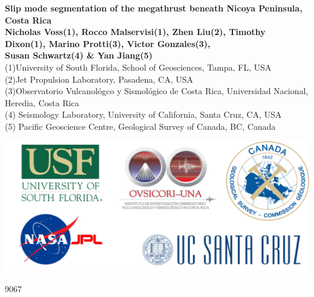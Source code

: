 \documentclass[a0,landscape]{a0poster}
\begin{document}


\begin{minipage}[c]{0.75\linewidth}
\fontsize{4cm}{4.5cm} \color{NavyBlue} 
\vspace{1cm}
\textbf{Slip mode segmentation of the megathrust beneath Nicoya Peninsula, Costa Rica} \color{Black}\\ %

\huge \textbf{Nicholas Voss(1), Rocco Malservisi(1), Zhen Liu(2), Timothy Dixon(1), Marino Protti(3), Victor Gonzales(3),\\ Susan Schwartz(4) \& Yan Jiang(5)}\\ %
\large 
(1)University of South Florida, School of Geosciences, Tampa, FL, USA\\  
(2)Jet Propulsion Laboratory, Pasadena, CA, USA\\
(3)Observatorio Vulcanológco y Sismológico de Costa Rica, Universidad Nacional, Heredia, Costa Rica\\
(4) Seismology Laboratory, University of California, Santa Cruz, CA, USA\\
(5) Pacific Geoscience Centre, Geological Survey of Canada, BC, Canada\\ %
\end{minipage}
%
\begin{minipage}[c]{0.2\linewidth}
	\includegraphics[width=36cm,trim=0cm 0cm 0cm 0cm, clip=true, ]{logos.png} %
\end{minipage}
\begin{minipage}[b]{0.1\linewidth}
		\hspace{1cm}
		\Huge 9067
\end{minipage}
\end{document}
